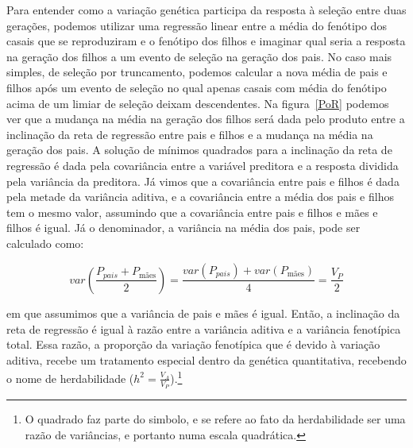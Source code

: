 \begin{refsection}
Para entender como a variação genética participa da resposta à seleção entre
duas gerações, podemos utilizar uma regressão linear entre a média do fenótipo
dos casais que se reproduziram e o fenótipo dos filhos e imaginar qual seria a
resposta na geração dos filhos a um evento de seleção na geração dos pais. No
caso mais simples, de seleção por truncamento, podemos calcular a nova média
de pais e filhos após um evento de seleção no qual apenas casais com média do
fenótipo acima de um limiar de seleção deixam descendentes. Na
figura~\ref{PoR} podemos ver que a mudança na média na geração dos filhos será
dada pelo produto entre a inclinação da reta de regressão entre pais e filhos
e a mudança na média na geração dos pais. A solução de mínimos quadrados para
a inclinação da reta de regressão é dada pela covariância entre a variável
preditora e a resposta dividida pela variância da preditora. Já vimos que a
covariância entre pais e filhos é dada pela metade da variância aditiva, e a
covariância entre a média dos pais e filhos tem o mesmo valor, assumindo que a
covariância entre pais e filhos e mães e filhos é igual. Já o denominador, a
variância na média dos pais, pode ser calculado como:

\begin{equation}
var(\frac{P_{pais} + P_{\text{mães}}}{2}) = \frac{var(P_{pais}) + var(P_{\text{mães}})}{4} = \frac{V_P}{2}
\end{equation}

em que assumimos que a variância de pais e mães é igual. Então, a inclinação da
reta de regressão é igual à razão entre a variância aditiva e a variância
fenotípica total. Essa razão, a proporção da variação fenotípica que é devido
à variação aditiva, recebe um tratamento especial dentro da genética
quantitativa, recebendo o nome de herdabilidade ($h^2 =
\frac{V_A}{V_P}$).\footnote{O quadrado faz parte do simbolo, e se refere ao
fato da herdabilidade ser uma razão de variâncias, e portanto numa escala
quadrática.}


\end{refsection}
